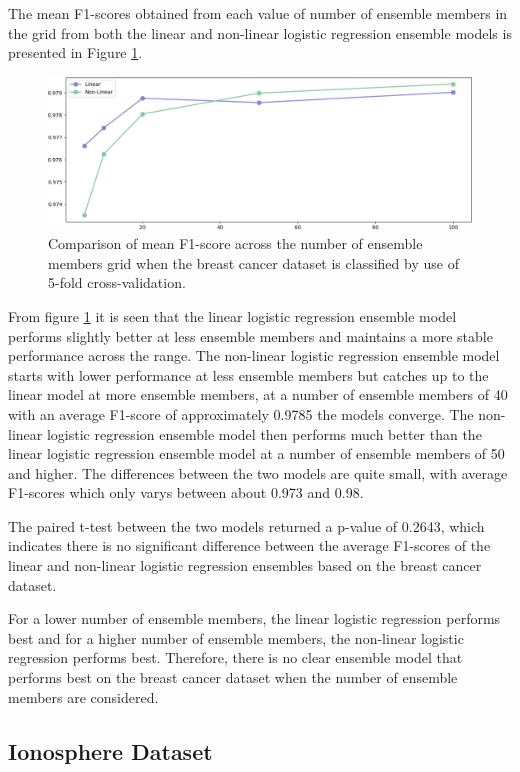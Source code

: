 \documentclass[10pt, conference]{IEEEtran}
\begin{document}
The mean F1-scores obtained from each value of number of ensemble members in the grid from both the linear and non-linear
logistic regression ensemble models is presented in Figure \ref{fig:BC_member_comparison}.
\begin{figure}[H]
    \centerline{\includegraphics[scale=0.26]{../Images/BC_members.PNG}}
    \caption{Comparison of mean F1-score across the number of ensemble members grid when the breast cancer dataset is classified by use of 5-fold cross-validation.}
    \label{fig:BC_member_comparison}
\end{figure}
From figure \ref{fig:BC_member_comparison} it is seen that the linear logistic regression ensemble model performs slightly better
at less ensemble members and maintains a more stable performance across the range. The non-linear logistic regression ensemble model
starts with lower performance at less ensemble members but catches up to the linear model at more ensemble members,
at a number of ensemble members of 40 with an average F1-score of approximately 0.9785 the models converge. The non-linear
logistic regression ensemble model then performs much better than the linear logistic regression ensemble model at a number
of ensemble members of 50 and higher. The differences between the two models are quite small, with average F1-scores which only
varys between about 0.973 and 0.98.

The paired t-test between the two models returned a p-value of 0.2643, which indicates there is no significant difference
between the average F1-scores of the linear and non-linear logistic regression ensembles based on the breast cancer dataset.

For a lower number of ensemble members, the linear logistic regression performs best and for a
higher number of ensemble members, the non-linear logistic regression performs best. Therefore, there is
no clear ensemble model that performs best on the breast cancer dataset when the number of ensemble members
are considered.

\subsection{Ionosphere Dataset}
\end{document}
